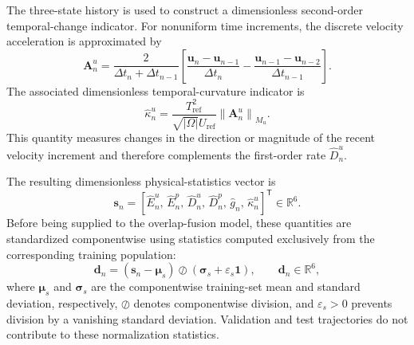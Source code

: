 The three-state history is used to construct a dimensionless second-order
temporal-change indicator.  For nonuniform time increments, the discrete
velocity acceleration is approximated by
\begin{equation}
  \boldsymbol{A}^{u}_n
  =
  \frac{2}{
    \Delta t_n+\Delta t_{n-1}
  }
  \left[
    \frac{
      \boldsymbol{u}_n-\boldsymbol{u}_{n-1}
    }{
      \Delta t_n
    }
    -
    \frac{
      \boldsymbol{u}_{n-1}-\boldsymbol{u}_{n-2}
    }{
      \Delta t_{n-1}
    }
  \right].
  \label{eq:discrete_velocity_acceleration}
\end{equation}
The associated dimensionless temporal-curvature indicator is
\begin{equation}
  \widehat{\kappa}^{u}_n
  =
  \frac{
    T_{\mathrm{ref}}^{2}
  }{
    \sqrt{|\Omega|}U_{\mathrm{ref}}
  }
  \left\|
    \boldsymbol{A}^{u}_n
  \right\|_{M_u}.
  \label{eq:dimensionless_velocity_curvature}
\end{equation}
This quantity measures changes in the direction or magnitude of the recent
velocity increment and therefore complements the first-order rate
$\widehat{D}^{u}_n$.

The resulting dimensionless physical-statistics vector is
\begin{equation}
  \boldsymbol{s}_n
  =
  \left[
    \widehat{E}^{u}_n,\,
    \widehat{E}^{p}_n,\,
    \widehat{D}^{u}_n,\,
    \widehat{D}^{p}_n,\,
    \widehat{g}_n,\,
    \widehat{\kappa}^{u}_n
  \right]^{\mathsf T}
  \in\mathbb{R}^{6}.
  \label{eq:dimensionless_physical_statistics}
\end{equation}
Before being supplied to the overlap-fusion model, these quantities are
standardized componentwise using statistics computed exclusively from the
corresponding training population:
\begin{equation}
  \boldsymbol{d}_n
  =
  \left(
    \boldsymbol{s}_n-\boldsymbol{\mu}_{s}
  \right)
  \oslash
  \left(
    \boldsymbol{\sigma}_{s}
    +\varepsilon_s\boldsymbol{1}
  \right),
  \qquad
  \boldsymbol{d}_n\in\mathbb{R}^{6},
  \label{eq:standardized_physical_descriptors}
\end{equation}
where $\boldsymbol{\mu}_{s}$ and $\boldsymbol{\sigma}_{s}$ are the
componentwise training-set mean and standard deviation, respectively,
$\oslash$ denotes componentwise division, and $\varepsilon_s>0$ prevents
division by a vanishing standard deviation.  Validation and test
trajectories do not contribute to these normalization statistics.

